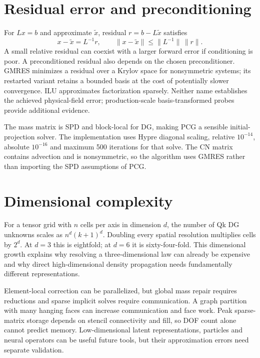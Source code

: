 \section{Residual error and preconditioning}
For $Lx=b$ and approximate $\widetilde x$, residual $r=b-L\widetilde x$ satisfies
\begin{equation}
 x-\widetilde x=L^{-1}r,\qquad
 \|x-\widetilde x\|\le\|L^{-1}\|\,\|r\|.
\end{equation}
A small relative residual can coexist with a larger forward error if conditioning is poor. A preconditioned residual also depends on the chosen preconditioner. GMRES minimizes a residual over a Krylov space for nonsymmetric systems; its restarted variant retains a bounded basis at the cost of potentially slower convergence. ILU approximates factorization sparsely. Neither name establishes the achieved physical-field error; production-scale basis-transformed probes provide additional evidence.

The mass matrix is SPD and block-local for DG, making PCG a sensible initial-projection solver. The implementation uses Hypre diagonal scaling, relative $10^{-14}$, absolute $10^{-16}$ and maximum 500 iterations for that solve. The CN matrix contains advection and is nonsymmetric, so the algorithm uses GMRES rather than importing the SPD assumptions of PCG.

\section{Dimensional complexity}
For a tensor grid with $n$ cells per axis in dimension $d$, the number of Qk DG unknowns scales as $n^d(k+1)^d$. Doubling every spatial resolution multiplies cells by $2^d$. At $d=3$ this is eightfold; at $d=6$ it is sixty-four-fold. This dimensional growth explains why resolving a three-dimensional law can already be expensive and why direct high-dimensional density propagation needs fundamentally different representations.

Element-local correction can be parallelized, but global mass repair requires reductions and sparse implicit solves require communication. A graph partition with many hanging faces can increase communication and face work. Peak sparse-matrix storage depends on stencil connectivity and fill, so DOF count alone cannot predict memory. Low-dimensional latent representations, particles and neural operators can be useful future tools, but their approximation errors need separate validation.


